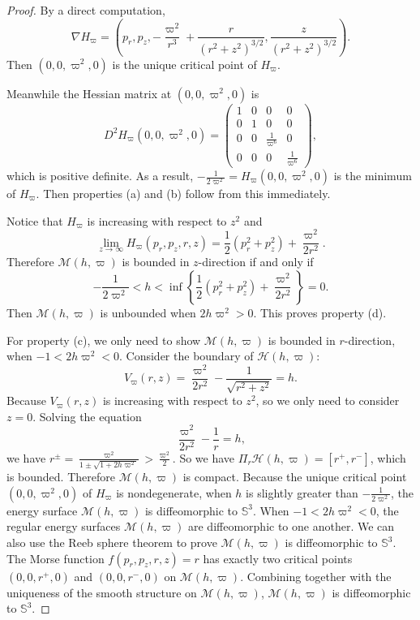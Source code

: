 \documentclass[11pt]{amsart}
\newcommand{\om}{\varpi}
\begin{document}
\begin{proof}
	By a direct computation, 
	\begin{equation*}
		\nabla H_{\om}=\left(p_{r}, p_{z},-\frac{\om^{2}}{r^{3}}+\frac{r}{(r^{2}+z^{2})^{3\slash2}},\frac{z}{(r^{2}+z^{2})^{3\slash2}}\right).
	\end{equation*}
	Then $(0,0,\om^2,0)$ is the unique critical point of $H_{\om}$.
	
	Meanwhile the Hessian matrix at $(0,0,\om^2,0)$ is
	\begin{equation*}
		D^{2}H_{\om}(0,0,\om^2,0)=\left({\begin{array}{cccc}
				1 & 0 & 0 & 0\\
				0 & 1 & 0 & 0\\
				0 & 0 & \frac{1}{\om^6} & 0\\
				0 & 0 & 0 & \frac{1}{\om^6}
		\end{array}}\right),
	\end{equation*}
	which is positive definite. As a result, $ -\frac{1}{2\om^2} =H_{\om}(0,0,\om^2,0)$ is the minimum of $H_{\om}$. Then properties (a) and (b) follow from this immediately.  

	Notice that $H_{\om}$ is increasing with respect to $z^2$ and
	$$ \lim_{z \to \infty}H_\om(p_r,p_z,r,z)=\frac{1}{2}(p_{r}^{2}+p_{z}^{2})+\frac{\om^2}{2r^2}.$$
Therefore $\mathcal{M}(h,\om)$ is bounded in $z$-direction if and only if
$$-\frac{1}{2\om^2}< h< \inf  \left\{ \frac{1}{2}(p_{r}^{2}+p_{z}^{2})+\frac{\om^2}{2r^2} \right\}=0.$$
Then $\mathcal{M}(h,\om)$ is unbounded when $2h\om^2>0$. This proves property (d). 

For property (c), we only need to show $\mathcal{M}(h,\om)$ is bounded in $r$-direction, when $-1<2h\om^2<0$. Consider the boundary of $\mathcal{H}(h,\om)$: 
\begin{equation}
	V_{\om}(r,z)=\frac{\om^{2}}{2r^{2}}-\frac{1}{\sqrt{r^{2}+z^{2}}}=h.
\end{equation}
Because $V_{\om}(r,z)$ is increasing with respect to $z^2$, so we only need to consider $z=0$. Solving the equation
\begin{equation}
	\frac{\om^{2}}{2r^{2}}-\frac{1}{r}=h,
\end{equation}
we have $r^{\pm}=\frac{\om^2}{1\pm\sqrt{1+2h\om^2}}>\frac{\om^2}{2}$. So we have $\Pi_{r}\mathcal{H}(h,\om)=[r^+,r^-]$, which is bounded. Therefore $\mathcal{M}(h,\om)$ is compact. Because the unique critical point $(0,0,\om^2,0)$ of $H_\om$ is nondegenerate, when $h$ is slightly greater than $-\frac{1}{2\om^2}$, the energy surface $\mathcal{M}(h,\om)$ is diffeomorphic to $\mathbb{S}^3$. When $-1<2h\om^2<0$, the regular energy surfaces $\mathcal{M}(h,\om)$ are diffeomorphic to one another. We can also use the Reeb sphere theorem to prove $\mathcal{M}(h,\om)$ is diffeomorphic to $\mathbb{S}^{3}$. The Morse function $f(p_r,p_z,r,z)=r$ has exactly two critical points $(0,0,r^+,0)$ and $(0,0,r^-,0)$ on $\mathcal{M}(h,\om)$. Combining together with the uniqueness of the smooth structure on $\mathcal{M}(h,\om)$, $\mathcal{M}(h,\om)$ is diffeomorphic to $\mathbb{S}^{3}$.
	

\end{proof}
\end{document}
